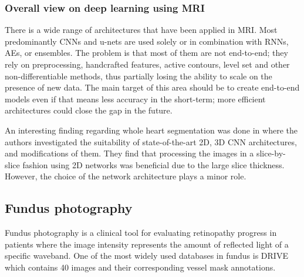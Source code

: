 \documentclass[journal]{IEEEtran}
\begin{document}
\subsubsection{Overall view on deep learning using MRI}
There is a wide range of architectures that have been applied in MRI\@.
Most predominantly CNNs and u-nets are used solely or in combination with RNNs, AEs, or ensembles.
The problem is that most of them are not end-to-end; they rely on preprocessing, handcrafted features, active contours, level set and other non-differentiable methods, thus partially losing the ability to scale on the presence of new data.
The main target of this area should be to create end-to-end models even if that means less accuracy in the short-term; more efficient architectures could close the gap in the future.

An interesting finding regarding whole heart segmentation was done in\cite{konukoglu2018exploration} where the authors investigated the suitability of state-of-the-art 2D, 3D CNN architectures, and modifications of them.
They find that processing the images in a slice-by-slice fashion using 2D networks was beneficial due to the large slice thickness.
However, the choice of the network architecture plays a minor role.

\subsection{Fundus photography}
Fundus photography is a clinical tool for evaluating retinopathy progress in patients where the image intensity represents the amount of reflected light of a specific waveband\cite{abramoff2010retinal}.
One of the most widely used databases in fundus is DRIVE which contains 40 images and their corresponding vessel mask annotations.
\end{document}
